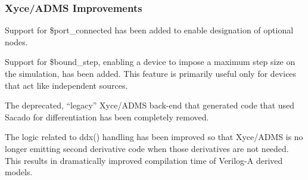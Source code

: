 \documentclass[letterpaper]{scrartcl}
\begin{document}
\subsubsection*{Xyce/ADMS Improvements}
\begin{XyceItemize}
  \item Support for \$port\_connected has been added to enable
    designation of optional nodes.
  \item Support for \$bound\_step, enabling a device to impose a
    maximum step size on the simulation, has been added.  This feature
    is primarily useful only for devices that act like independent
    sources.
  \item The deprecated, ``legacy'' Xyce/ADMS back-end that generated
    code that used Sacado for differentiation has been completely
    removed.
  \item The logic related to ddx() handling has been improved so that
    Xyce/ADMS is no longer emitting second derivative code when those
    derivatives are not needed.  This results in dramatically improved
    compilation time of Verilog-A derived models.
\end{XyceItemize}
\end{document}
